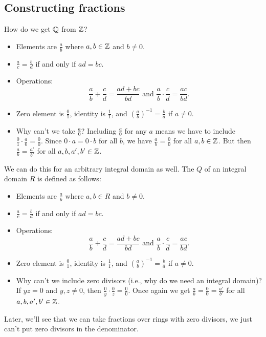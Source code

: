 \documentclass[12pt,letterpaper]{report}
\begin{document}
\pagebreak
\subsection{Constructing fractions}

How do we get $\mathbb{Q}$ from $\mathbb{Z}$?
\begin{itemize}
  \item Elements are $\frac{a}{b}$ where $a, b \in \mathbb{Z}$ and $b \neq 0$.
  \item $\frac{a}{c} = \frac{b}{d}$ if and only if $ad = bc$.
  \item Operations:
  \[ \frac{a}{b} + \frac{c}{d} = \frac{ad + bc}{bd}
    \text{ and } \frac{a}{b} \cdot \frac{c}{d} = \frac{ac}{bd}. \]
  \item Zero element is $\frac{0}{1}$, identity is $\frac{1}{1}$, and
    $\left(\frac{a}{b}\right)^{-1} = \frac{b}{a}$ if $a \neq 0$.
  \item Why can't we take $\frac{a}{0}$?
    Including $\frac{a}{0}$ for any $a$ means we have to include
    $\frac{0}{1} \cdot \frac{a}{0} = \frac{0}{0}$.
    Since $0 \cdot a = 0 \cdot b$ for all $b$, we have $\frac{a}{b} = \frac{0}{0}$ for all
    $a, b \in \mathbb{Z}$.
    But then $\frac{a}{b} = \frac{a'}{b'}$ for all $a, b, a', b' \in \mathbb{Z}$.
\end{itemize}

We can do this for an arbitrary integral domain as well.
The  $Q$ of an integral domain $R$ is defined as follows:
\begin{itemize}
  \item Elements are $\frac{a}{b}$ where $a, b \in R$ and $b \neq 0$.
  \item $\frac{a}{c} = \frac{b}{d}$ if and only if $ad = bc$.
  \item Operations:
  \[ \frac{a}{b} + \frac{c}{d} = \frac{ad + bc}{bd}
    \text{ and } \frac{a}{b} \cdot \frac{c}{d} = \frac{ac}{bd}. \]
  \item Zero element is $\frac{0}{1}$, identity is $\frac{1}{1}$, and
    $\left(\frac{a}{b}\right)^{-1} = \frac{b}{a}$ if $a \neq 0$.
  \item Why can't we include zero divisors (i.e., why do we need an integral domain)?
    If $yz = 0$ and $y, z \neq 0$, then $\frac{0}{y} \cdot \frac{0}{z} = \frac{0}{0}$.
    Once again we get $\frac{a}{b} = \frac{0}{0} = \frac{a'}{b'}$ for all $a, b, a', b' \in \mathbb{Z}$.
\end{itemize}
Later, we'll see that we can take fractions over rings with zero divisors, we just can't put zero
divisors in the denominator.
\end{document}
